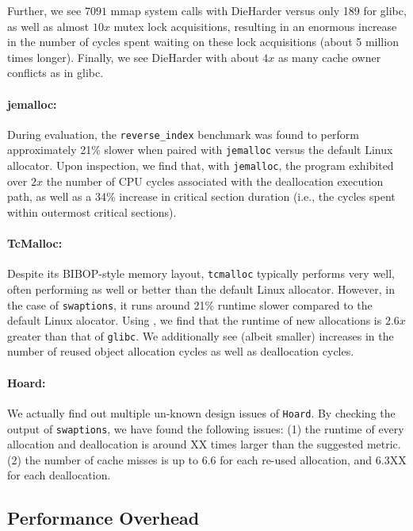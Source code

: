 	Further, we see $7091$ mmap system calls with DieHarder versus only 189 for glibc, as well as almost $10x$ mutex lock acquisitions, resulting in an enormous increase in the number of cycles spent waiting on these lock acquisitions (about 5 million times longer).
	Finally, we see DieHarder with about $4x$ as many cache owner conflicts as in glibc.

\paragraph{jemalloc:}
During evaluation, the \texttt{reverse\_index} benchmark was found to perform approximately 21\% slower when paired with \texttt{jemalloc} versus the default Linux allocator. Upon inspection, we find that, with \texttt{jemalloc}, the program exhibited over $2x$ the number of CPU cycles associated with the deallocation execution path, as well as a 34\% increase in critical section duration (i.e., the cycles spent within outermost critical sections).

\paragraph{TcMalloc:}
Despite its BIBOP-style memory layout, \texttt{tcmalloc} typically performs very well, often performing as well or better than the default Linux allocator. However, in the case of \texttt{swaptions}, it runs around 21\% runtime slower compared to the default Linux alocator. Using \MP{}, we find that the runtime of new allocations  is $2.6x$ greater than that of \texttt{glibc}. We additionally see (albeit smaller) increases in the number of reused object allocation cycles as well as deallocation cycles.


\paragraph{Hoard:} 
We actually find out multiple un-known design issues of \texttt{Hoard}. By checking the output of \texttt{swaptions}, we have found the following issues: (1) the runtime of every allocation and deallocation is around XX times larger than the suggested metric. (2) the number of cache misses  is up to 6.6 for each re-used allocation, and 6.3XX for each deallocation.  

\subsection{Performance Overhead}
\label{sec:perf}

